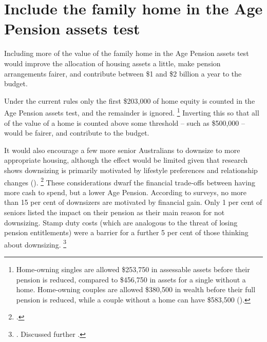 \section{Include the family home in the Age Pension assets test}\label{sec:include-the-family-home-in-age-pension-assets-test}

Including more of the value of the family home in the Age Pension assets test would improve the allocation of housing assets a little, make pension arrangements fairer, and contribute between \$1 and \$2 billion a year to the budget.

Under the current rules only the first \$203,000 of home equity is counted in the Age Pension assets test, and the remainder is ignored.%
	\footnote{Home-owning singles are allowed \$253,750 in assessable assets before their pension is reduced, compared to \$456,750 in assets for a single without a home.
	Home-owning couples are allowed \$380,500 in wealth before their full pension is reduced, while a couple without a home can have \$583,500 (\textcite{DHS-2017-Age-pension}).}
Inverting this so that all of the value of a home is counted above some threshold -- such as \$500,000 -- would be fairer, and contribute to the budget.

It would also encourage a few more senior Australians to downsize to more appropriate housing, although the effect would be limited given that research shows downsizing is primarily motivated by lifestyle preferences and relationship changes ().%
	\footcites{PC-2015-Housing-decisions-elderly}{TheAge-2017-Real-reason-retirees-keep-big-homes}
These considerations dwarf the financial trade-offs between having more cash to spend, but a lower Age Pension.
According to surveys, no more than 15 per cent of downsizers are motivated by financial gain.
Only 1 per cent of seniors listed the impact on their pension as their main reason for not downsizing.
Stamp duty costs (which are analogous to the threat of losing pension entitlements) were a barrier for a further 5 per cent of those thinking about downsizing.%
	\footnote{\textcite{JuddEtAlDownsizing2014}. Discussed further .}


